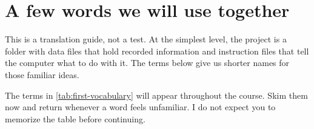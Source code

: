 \section{A few words we will use together}

\begin{plainlanguage}
This is a translation guide, not a test. At the simplest level, the project is
a folder with data files that hold recorded information and instruction files
that tell the computer what to do with it. The terms below give us shorter
names for those familiar ideas.
\end{plainlanguage}

The terms in \cref{tab:first-vocabulary} will appear throughout the course.
Skim them now and return whenever a word feels unfamiliar. I do not expect you
to memorize the table before continuing.

